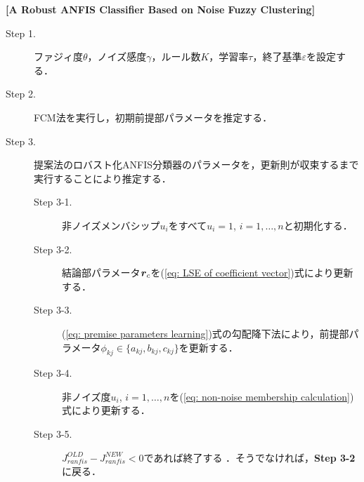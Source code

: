 \documentclass{ujarticle}
\begin{document}
\vspace{5mm}
\noindent
\textbf{[A Robust ANFIS Classifier Based on Noise Fuzzy Clustering]}

\begin{description}
	\item[Step 1.] ファジィ度$\theta$，ノイズ感度$\gamma$，ルール数$K$，学習率$\tau$，終了基準$\varepsilon$を設定する．
	\item[Step 2.] FCM法を実行し，初期前提部パラメータを推定する．
	\item[Step 3.] 提案法のロバスト化ANFIS分類器のパラメータを，更新則が収束するまで実行することにより推定する．
	\begin{description}
		\item[Step 3-1.] 非ノイズメンバシップ$u_{i}$をすべて$u_{i}=1$, $i=1, \dots, n$と初期化する．
		\item[Step 3-2.] 結論部パラメータ$\mbox{\boldmath $r$}_c$を(\ref{eq: LSE of coefficient vector})式により更新する．
		\item[Step 3-3.] (\ref{eq: premise parameters learning})式の勾配降下法により，前提部パラメータ$\phi_{kj} \in \{ a_{kj}, b_{kj}, c_{kj} \}$を更新する．
		\item[Step 3-4.] 非ノイズ度$u_{i}$, $i=1, \dots, n$を(\ref{eq: non-noise membership calculation})式により更新する．
		\item[Step 3-5.] $ J_{ranfis}^{OLD} - J_{ranfis}^{NEW} < 0$であれば終了する
    ．そうでなければ，\textbf{Step 3-2}に戻る．
	\end{description}

\end{description}
\end{document}
